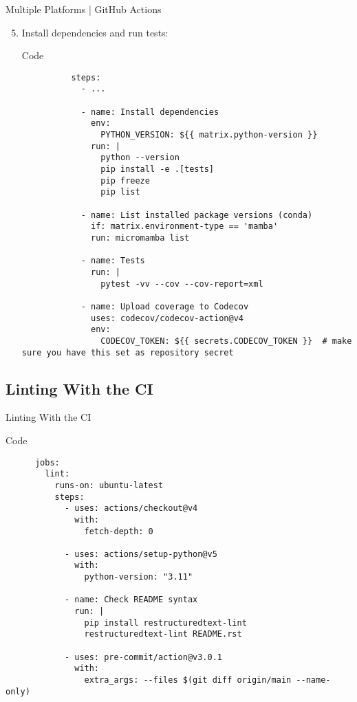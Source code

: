 \begin{frame}[fragile]{
    Multiple Platforms | GitHub Actions
  }
  \begin{enumerate}
    \setcounter{enumi}{4}
    \item Install dependencies and run tests:
      \begin{block}{Code}
        \scriptsize
        \begin{verbatim}
          steps:
            - ...

            - name: Install dependencies
              env:
                PYTHON_VERSION: ${{ matrix.python-version }}
              run: |
                python --version
                pip install -e .[tests]
                pip freeze
                pip list

            - name: List installed package versions (conda)
              if: matrix.environment-type == 'mamba'
              run: micromamba list

            - name: Tests
              run: |
                pytest -vv --cov --cov-report=xml

            - name: Upload coverage to Codecov
              uses: codecov/codecov-action@v4
              env:
                CODECOV_TOKEN: ${{ secrets.CODECOV_TOKEN }}  # make sure you have this set as repository secret
        \end{verbatim}
      \end{block}
  \end{enumerate}
\end{frame}

\subsection{Linting With the CI}
\begin{frame}[fragile]{Linting With the CI}
  \begin{block}{Code}
    \begin{verbatim}
      jobs:
        lint:
          runs-on: ubuntu-latest
          steps:
            - uses: actions/checkout@v4
              with:
                fetch-depth: 0

            - uses: actions/setup-python@v5
              with:
                python-version: "3.11"

            - name: Check README syntax
              run: |
                pip install restructuredtext-lint
                restructuredtext-lint README.rst

            - uses: pre-commit/action@v3.0.1
              with:
                extra_args: --files $(git diff origin/main --name-only)
    \end{verbatim}
  \end{block}
\end{frame}

